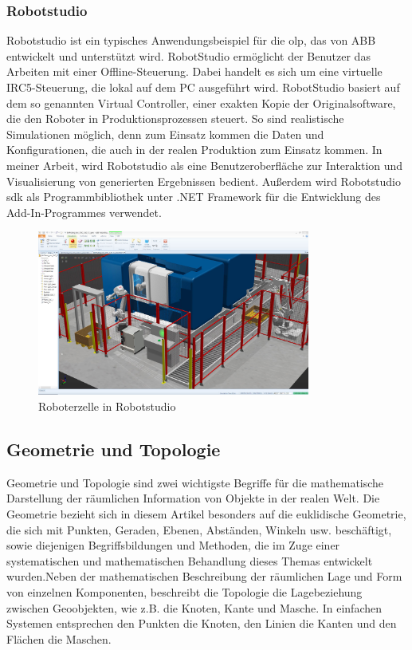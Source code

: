 \documentclass[14pt,a4paper,titlepage]{article}
\begin{document}
	\subsubsection{Robotstudio}
	Robotstudio ist ein typisches Anwendungsbeispiel für die \acf{olp}, das von ABB entwickelt und unterstützt wird. RobotStudio ermöglicht der Benutzer das Arbeiten mit einer Offline-Steuerung. Dabei
	handelt es sich um eine virtuelle IRC5-Steuerung, die lokal auf dem PC ausgeführt
	wird. RobotStudio basiert auf dem so genannten Virtual Controller, einer exakten Kopie der Originalsoftware, die den Roboter in Produktionsprozessen steuert. So sind realistische Simulationen möglich, denn zum Einsatz kommen die Daten und Konfigurationen, die auch in der realen Produktion zum Einsatz kommen.\cite{robotstudio} 
	In meiner Arbeit, wird Robotstudio als eine Benutzeroberfläche zur Interaktion und Visualisierung von generierten Ergebnissen bedient. Außerdem wird Robotstudio \acf{sdk} als Programmbibliothek unter .NET Framework für die Entwicklung des Add-In-Programmes verwendet.
	\begin{figure}[h!]
		\centering
		\includegraphics[width=0.8\textwidth]{robotstudio.jpg}
		\caption{Roboterzelle in Robotstudio}
		\label{fig2}
	\end{figure} 
	\pagebreak 
	\subsection{Geometrie und Topologie}
		Geometrie und Topologie sind zwei wichtigste Begriffe für die mathematische Darstellung der räumlichen Information von Objekte in der realen Welt. Die Geometrie bezieht sich in diesem Artikel besonders auf die euklidische Geometrie, die sich mit Punkten, Geraden, Ebenen, Abständen, Winkeln usw. beschäftigt, sowie diejenigen Begriffsbildungen und Methoden, die im Zuge einer systematischen und mathematischen Behandlung dieses Themas entwickelt wurden.\cite{geometrie}Neben der mathematischen Beschreibung der räumlichen Lage und Form von einzelnen Komponenten, beschreibt die Topologie die Lagebeziehung zwischen Geoobjekten, wie z.B. die Knoten, Kante und Masche. In einfachen Systemen entsprechen den Punkten die Knoten, den Linien die Kanten und den Flächen die Maschen.\cite{topologie}
		
\end{document}
